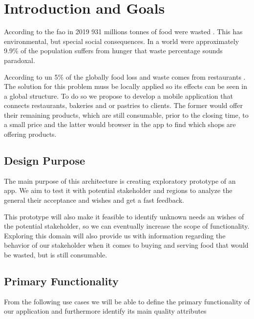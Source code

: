 \section{Introduction and Goals}

According to the \acrfull{fao} in 2019 931 millions tonnes of food were wasted \cite{refart:FAOFW}. This has
environmental, but special social consequences. In a world were approximately 9.9\% of the \cite{refart:AAHWH}
population suffers from hunger that waste percentage sounds paradoxal.

According to \acrfull{un} 5\% of the globally food loss and waste comes from restaurants \cite{refart:UNSP}. 
The solution for this problem muss be locally applied so its effects can be seen in a global structure. To do so we
propose to develop a mobile application that connects restaurants, bakeries and or pastries to clients. 
The former would offer their remaining products, which are still consumable, prior to the closing time, to a small price 
and the latter would browser in the app to find which shops are offering products. 

 
\subsection{Design Purpose}

The main purpose of this architecture is creating exploratory prototype of an \gls{app}. We aim to test it with potential 
\gls{stakeholder} and regions to analyze the general their acceptance and wishes \cite{refbook:DSHC} and get a fast feedback. 

This prototype will also make it feasible to identify unknown needs an wishes of the potential \gls{stakeholder}, so we can eventually
increase the scope of functionality. Exploring this domain will also provide us with information regarding the behavior 
of our \gls{stakeholder} when it comes to buying and serving food that would be wasted, but is still consumable.

\subsection{Primary Functionality} \label{Primary_Functionality}

From the following use cases we will be able to define the primary functionality of our application and furthermore 
identify its main quality attributes 


